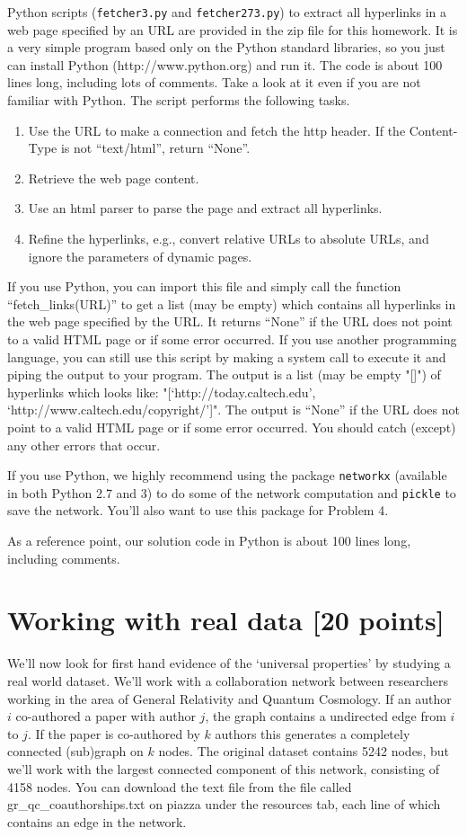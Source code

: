 \documentclass[11pt]{article}
\begin{document}
 Python scripts (\texttt{fetcher3.py} and \texttt{fetcher273.py}) to extract all hyperlinks
in a web page specified by an URL are provided in the zip file for this homework. It is a very simple program based only on the Python standard libraries, so you just can install Python (http://www.python.org) and run it.  The
code is about 100 lines long, including lots of comments. Take a look
at it even if you are not familiar with Python. The script performs the
following tasks.
\begin{enumerate}
\item Use the URL to make a connection and fetch the http header. If
  the Content-Type is not ``text/html'', return ``None''.
\item Retrieve the web page content.
\item Use an html parser to parse the page and extract all hyperlinks.
\item Refine the hyperlinks, e.g., convert relative URLs to absolute
  URLs, and ignore the parameters of dynamic pages.
\end{enumerate}
If you use Python, you can import this file and simply call the
function ``fetch\_links(URL)'' to get a list (may be empty) which
contains all hyperlinks in the web page specified by the URL. It
returns ``None'' if the URL does not point to a valid HTML page or if
some error occurred. If you use another programming language, you can
still use this script by making a system call to execute it and piping
the output to your program. The output is a list (may be empty "[]")
of hyperlinks which looks like: "[`http://today.caltech.edu',
`http://www.caltech.edu/copyright/']". The output is ``None'' if the
URL does not point to a valid HTML page or if some error
occurred. You should catch (except) any other errors that occur.

If you use Python, we highly recommend using the package \texttt{networkx} (available in both Python 2.7 and 3) to do some of the network computation and \texttt{pickle} to save the network. You'll also want to use this package for Problem 4.

As a reference point, our solution code in Python is about 100 lines long, including comments.


\section{Working with real data [20 points]}
\label{prob:realdata}

We'll now look for first hand evidence of the `universal properties' by studying a real world dataset. We'll work with a collaboration network between researchers working in the area of General Relativity and Quantum Cosmology. If an author $i$ co-authored a paper with author $j$, the graph contains a undirected edge from $i$ to $j$. If the paper is co-authored by $k$ authors this generates a completely connected (sub)graph on $k$ nodes. The original dataset contains 5242 nodes, but we'll work with the largest connected component of this network, consisting of 4158 nodes. You can download the text file from the file called gr\_qc\_coauthorships.txt on piazza under the resources tab, each line of which contains an edge in the network.
\end{document}
